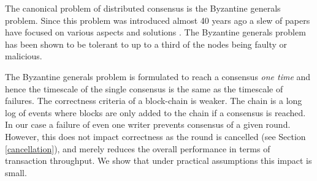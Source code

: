 \documentclass[10pt]{article}
\begin{document}
The canonical problem of distributed consensus is the Byzantine generals problem.
Since this problem was introduced almost 40 years ago \cite{byzantine} a slew of papers have focused on various aspects and solutions \cite{bracha, PBFT}. The Byzantine generals problem has been shown to be tolerant to up to a third of the nodes being faulty or malicious.

The Byzantine generals problem is formulated to reach a consensus \emph{one time} and hence the timescale of the single consensus is the same as the timescale of failures. 
The correctness criteria of a block-chain is weaker. The chain is a long log of events where blocks are only added to the chain if a consensus is reached. In our case a failure of even one writer prevents consensus of a given round. However, this does not impact correctness as the round is cancelled (see Section \ref{cancellation}), and merely reduces the overall performance in terms of transaction throughput. We show that under practical assumptions this impact is small.

\end{document}
